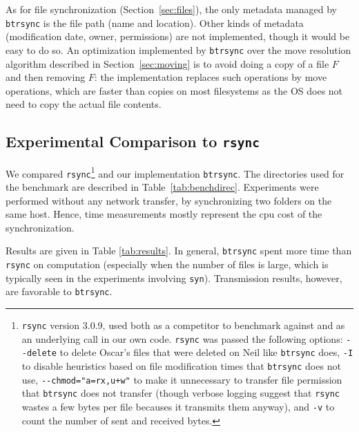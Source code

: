 \documentclass[twoside,envcountsame,runningheads]{llncs}
\newcommand{\btrsync}{\texttt{btrsync}\xspace}
\newcommand{\rsync}{\texttt{rsync}\xspace}
\begin{document}
As for file synchronization (Section~\ref{sec:files}), the only metadata managed by
\btrsync is the file path (name and location). Other kinds of metadata
(modification date, owner, permissions) are not implemented, though it would be
easy to do so. An optimization implemented by \btrsync over the move resolution algorithm described in Section~\ref{sec:moving} is to avoid doing a copy of a file $F$ and then removing $F$: the implementation replaces such operations by move operations, which are faster than copies on most filesystems as the OS does not need to copy the actual file contents.

\subsection{Experimental Comparison to \rsync}

We compared \rsync\footnote{\rsync version 3.0.9, used both as a competitor to
benchmark against and as an underlying call in our own code. \rsync was passed
the following options: {\tt {-}{-}delete} to delete Oscar's files that were
deleted on Neil like \btrsync does, {\tt -I} to disable heuristics based on file
modification times that \btrsync does not use, {\tt {-}{-}chmod="a=rx,u+w"} to make it unnecessary to
transfer file permission that \btrsync does not transfer (though verbose logging
suggest that \rsync wastes a few bytes per file becauses it transmits them
anyway), and {\tt -v} to count the number of sent and received bytes.} and our
implementation \btrsync. The directories used for the
benchmark are described in Table~\ref{tab:benchdirec}.
Experiments
were performed without any network transfer, by synchronizing two folders on
the same host. Hence, time measurements mostly represent the {\sc cpu} cost of
the synchronization.

Results are given in Table \ref{tab:results}. In general, \btrsync spent more time than \rsync on computation (especially when the number of files is large, which is typically seen in the experiments involving {\tt syn}). Transmission results, however, are favorable to \btrsync.
\end{document}

